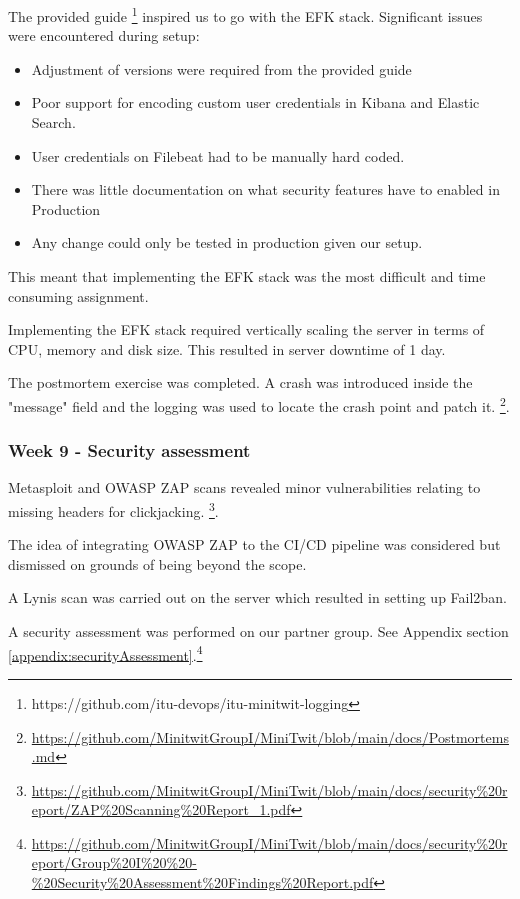 \documentclass{article}
\begin{document}
The provided guide \footnote{https://github.com/itu-devops/itu-minitwit-logging} inspired us to go with the EFK stack. Significant issues were encountered during setup:

\begin{itemize}
    \item Adjustment of versions were required from the provided guide 
    \item Poor support for encoding custom user credentials in Kibana and Elastic Search.
    \item User credentials on Filebeat had to be manually hard coded.
    \item There was little documentation on what security features have to enabled in Production
    \item Any change could only be tested in production given our setup.
\end{itemize}

This meant that implementing the EFK stack was the most difficult and time consuming assignment. 

Implementing the EFK stack required vertically scaling the server in terms of CPU, memory and disk size. This resulted in server downtime of 1 day. 

The postmortem exercise was completed. A crash was introduced inside the "message" field and the logging was used to locate the crash point and patch it. \footnote{\url{https://github.com/MinitwitGroupI/MiniTwit/blob/main/docs/Postmortems.md}}. 

\subsubsection{Week 9 - Security assessment}

Metasploit and OWASP ZAP scans revealed minor vulnerabilities relating to missing headers for clickjacking.
\footnote{\url{https://github.com/MinitwitGroupI/MiniTwit/blob/main/docs/security\%20report/ZAP\%20Scanning\%20Report_1.pdf}}. 

The idea of integrating OWASP ZAP to the CI/CD pipeline was considered but dismissed on grounds of being beyond the scope.

A Lynis scan was carried out on the server which resulted in setting up Fail2ban. 

A security assessment was performed on our partner group. See Appendix section  \ref{appendix:securityAssessment}.\footnote{\url{https://github.com/MinitwitGroupI/MiniTwit/blob/main/docs/security\%20report/Group\%20I\%20\%20-\%20Security\%20Assessment\%20Findings\%20Report.pdf}}
\end{document}
